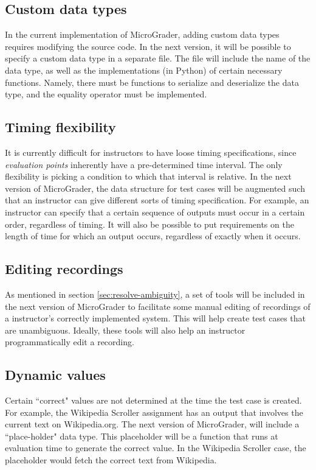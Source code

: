 \documentclass[12pt]{article}
\begin{document}
\subsection{Custom data types}
In the current implementation of MicroGrader, adding custom data types requires modifying the source code.  In the next version, it will be possible to specify a custom data type in a separate file.  The file will include the name of the data type, as well as the implementations (in Python) of certain necessary functions.  Namely, there must be functions to serialize and deserialize the data type, and the equality operator must be implemented.

\subsection{Timing flexibility}
It is currently difficult for instructors to have loose timing specifications, since \textit{evaluation points} inherently have a pre-determined time interval.  The only flexibility is picking a condition to which that interval is relative.  In the next version of MicroGrader, the data structure for test cases will be augmented such that an instructor can give different sorts of timing specification.  For example, an instructor can specify that a certain sequence of outputs must occur in a certain order, regardless of timing.  It will also be possible to put requirements on the length of time for which an output occurs, regardless of exactly when it occurs.

\subsection{Editing recordings}
As mentioned in section \ref{sec:resolve-ambiguity}, a set of tools will be included in the next version of MicroGrader to facilitate some manual editing of recordings of a instructor's correctly implemented system.  This will help create test cases that are unambiguous.  Ideally, these tools will also help an instructor programmatically edit a recording.

\subsection{Dynamic values}
Certain ``correct" values are not determined at the time the test case is created.  For example, the Wikipedia Scroller assignment has an output that involves the current text on Wikipedia.org.  The next version of MicroGrader, will include a ``place-holder" data type.  This placeholder will be a function that runs at evaluation time to generate the correct value.  In the Wikipedia Scroller case, the placeholder would fetch the correct text from Wikipedia.
\end{document}
